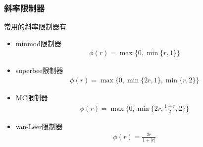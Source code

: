 \documentclass[8pt,mathserif]{beamer}
\begin{document}
\begin{frame}
  \frametitle{斜率限制器}
  常用的斜率限制器有
  \begin{itemize}
    \item minmod限制器 
      \begin{align*}
        \phi(r) = \max\{0,\min\{r,1\}\}
      \end{align*}
    \item superbee限制器
      \begin{align*}
        \phi(r) = \max\{0,\min\{2r,1\},\min\{r,2\}\}
      \end{align*}
    \item MC限制器 
      \begin{align*}
        \phi(r) = \max\{0,\min\{2r,\frac{1+r}{2},2\}\}
      \end{align*}
    \item van-Leer限制器
      \begin{align*}
        \phi(r) = \frac{2r}{1+|r|}
      \end{align*}
  \end{itemize}
\end{frame}
\end{document}
